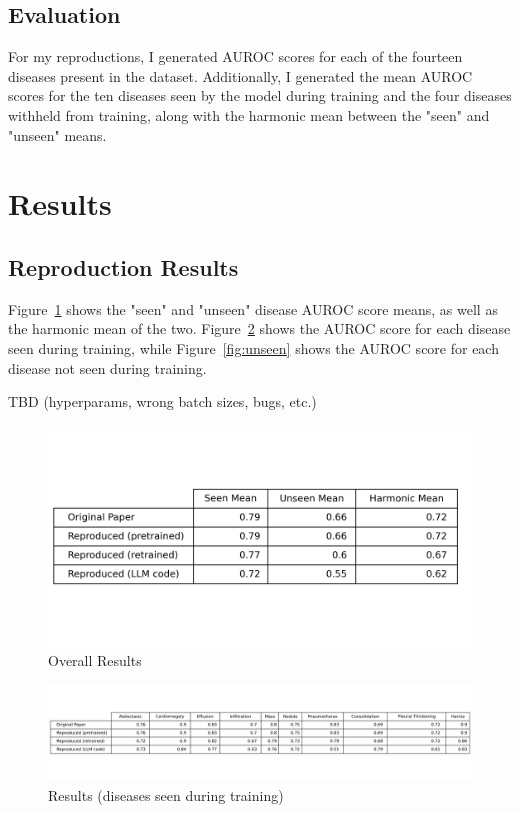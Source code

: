\documentclass[letterpaper]{article} %
\begin{document}
\subsection{Evaluation}

For my reproductions, I generated AUROC scores for each of the fourteen diseases present in the dataset. Additionally, I generated the mean AUROC scores for the ten diseases seen by the model during training and the four diseases withheld from training, along with the harmonic mean between the "seen" and "unseen" means.

\section{Results}

\subsection{Reproduction Results}

Figure~\ref{fig:means} shows the "seen" and "unseen" disease AUROC score means, as well as the harmonic mean of the two. Figure~\ref{fig:seen} shows the AUROC score for each disease seen during training, while Figure~\ref{fig:unseen} shows the AUROC score for each disease not seen during training.

TBD (hyperparams, wrong batch sizes, bugs, etc.)

\begin{figure}[h!]
\centering
\includegraphics[width=0.9\columnwidth]{means.png}
\caption{Overall Results}
\label{fig:means}
\end{figure}

\begin{figure}[h!]
\centering
\includegraphics[width=0.9\columnwidth]{seen.png}
\caption{Results (diseases seen during training)}
\label{fig:seen}
\end{figure}
\end{document}

